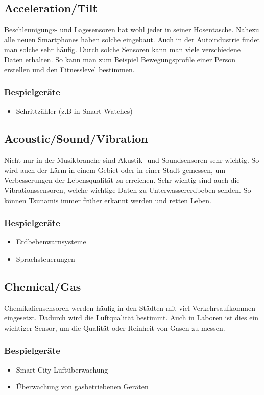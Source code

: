 \subsection{Acceleration/Tilt}
Beschleunigungs- und Lagesensoren hat wohl jeder in seiner Hosentasche. Nahezu alle neuen Smartphones haben solche eingebaut. Auch in der Autoindustrie findet man solche sehr häufig. Durch solche Sensoren kann man viele verschiedene Daten erhalten. So kann man zum Beispiel Bewegungsprofile einer Person erstellen und den Fitnesslevel bestimmen.
\subsubsection{Bespielgeräte}
\begin{itemize}
\item	Schrittzähler (z.B in Smart Watches)
\end{itemize}


\subsection{Acoustic/Sound/Vibration}%
Nicht nur in der Musikbranche sind Akustik- und Soundsensoren sehr wichtig. So wird auch der Lärm in einem Gebiet oder in einer Stadt gemessen, um Verbesserungen der Lebensqualität zu erreichen. Sehr wichtig sind auch die Vibrationssensoren, welche wichtige Daten zu Unterwassererdbeben senden. So können Tsunamis immer früher erkannt werden und retten Leben.
\subsubsection{Bespielgeräte}
\begin{itemize}
\item	Erdbebenwarnsysteme
\item	Sprachsteuerungen
\end{itemize}


\subsection{Chemical/Gas}%
Chemikaliensensoren werden häufig in den Städten mit viel Verkehrsaufkommen eingesetzt. Dadurch wird die Luftqualität bestimmt. Auch in Laboren ist dies ein wichtiger Sensor, um die Qualität oder Reinheit von Gasen zu messen.
\subsubsection{Bespielgeräte}
\begin{itemize}
\item	Smart City Luftüberwachung
\item	Überwachung von gasbetriebenen Geräten
\end{itemize}



